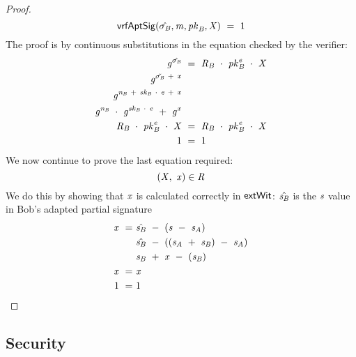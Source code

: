 \begin{proof}
    \[
        \mathsf{vrfAptSig}(\hat{\sigma_{\mathit{B}}},\mathit{m},\mathit{pk}_{\mathit{B}},\mathit{X}) ~=~ 1
    \]
    The proof is by continuous substitutions in the equation checked by the verifier:
    \begin{align}
        \mathit{g}^{\hat{\sigma_{\mathit{B}}}} &~=~ \mathit{R}_{\mathit{B}} ~\cdot~ \mathit{pk}_{\mathit{B}}^{\mathit{e}} ~\cdot~ \mathit{X} \\
        \mathit{g}^{\tilde{\sigma_{\mathit{B}}} ~+~ \mathit{x}} & \\
        \mathit{g}^{\mathit{\mathit{n}_{\mathit{B}}} ~+~ \mathit{sk}_{\mathit{B}} ~\cdot~ \mathit{e} ~+~ \mathit{x}} & \\
        \mathit{g}^{\mathit{\mathit{n}_{\mathit{B}}}} ~\cdot~ \mathit{g}^{\mathit{sk}_{\mathit{B}} ~\cdot~ \mathit{e}} ~+~ \mathit{g}^{\mathit{x}} & \\
        \mathit{R}_{\mathit{B}} ~\cdot~ \mathit{pk}_{\mathit{B}}^{\mathit{e}} ~\cdot~ \mathit{X} &~=~ \mathit{R}_{\mathit{B}} ~\cdot~ \mathit{pk}_{\mathit{B}}^{\mathit{e}} ~\cdot~ \mathit{X} \\
        1 &~=~ 1
    \end{align}
    We now continue to prove the last equation required:
    \[
        (\mathit{X} ,~ \mathit{x}) \in \mathit{R}
    \]
    We do this by showing that $\mathit{x}$ is calculated correctly in $\mathsf{extWit}$:
    $\hat{\mathit{s}_{\mathit{B}}}$ is the $\mathit{s}$ value in Bob's adapted partial signature
    \begin{align}
        \mathit{x} ~=~ & \hat{\mathit{s}_{\mathit{B}}} ~-~ (\mathit{s} ~-~ \mathit{s}_{\mathit{A}}) \\
        & \hat{\mathit{s}_{\mathit{B}}} ~-~ ((\mathit{s}_{\mathit{A}} ~+~ \mathit{s}_{\mathit{B}} ) ~-~ \mathit{s}_{\mathit{A}} ) \\
        & \mathit{s}_{\mathit{B}} ~+~ \mathit{x} ~-~ (\mathit{s}_{\mathit{B}}) \\
        \mathit{x} ~=~ & \mathit{x} \\
        1 ~=~ & 1
    \end{align}
\end{proof}

\subsection{Security}\label{subsec:sig:secureaptscheme}

